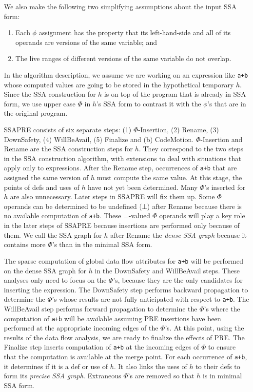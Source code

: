 We also make the following two simplifying assumptions about the input SSA
form:
\begin{enumerate}
\item Each $\phi$ assignment has the property that its left-hand-side and
all of its operands are versions of the same variable; and
\item The live ranges of different versions of the same variable do not
overlap.
\end{enumerate}

In the algorithm description, we assume we are working on an expression like
{\tt a+b} whose computed values are going to be stored in the hypothetical
temporary $h$.  Since the SSA construction for $h$ is on top of the program
that is already in SSA form, we use upper case $\Phi$ in $h$'s SSA form to 
contrast it with the $\phi$'s that are in the original program.

SSAPRE consists of six separate steps: (1) $\Phi$-Insertion, (2) Rename,
(3) DownSafety, (4) WillBeAvail, (5) Finalize and (b) CodeMotion.
$\Phi$-Insertion and Rename are the SSA construction steps for $h$.  They
correspond to the two steps in the SSA construction algorithm, with 
extensions to deal with situations that apply only to expressions.  After
the Rename step, occurrences of {\tt a+b} that are assigned the same version
of $h$ must compute the same value.  At this stage, the points of defs and
uses of $h$ have not yet been determined.  Many $\Phi$'s inserted for $h$
are also unnecessary.  Later steps in SSAPRE will fix them up.  Some $\Phi$
operands can be determined to be undefined ($\bot$) after Rename because 
there is no available computation of {\tt a+b}.  These $\bot$-valued
$\Phi$ operands will play a key role in the later steps of SSAPRE because
insertions are performed only because of them.  We call the SSA graph for
$h$ after Rename the \emph{dense SSA graph} because it contains more $\Phi$'s
than in the minimal SSA form.

The sparse computation of global data flow attributes for {\tt a+b} will be
performed on the dense SSA graph for $h$ in the DownSafety and WillBeAvail
steps.  These analyses only need to focus on the $\Phi$'s, because they
are the only candidates for inserting the expression.
The DownSafety step performs backward propagation to determine 
the $\Phi$'s whose results are not fully anticipated with respect to 
{\tt a+b}.  The WillBeAvail step performs forward propagation to determine
the $\Phi$'s where the computation of {\tt a+b} will be available assuming
PRE insertions have been performed at the appropriate incoming edges of the
$\Phi$'s.  At this point, using the results of the data flow analysis, we
are ready to finalize the effects of PRE.  The Finalize step inserts
computation of {\tt a+b} at the incoming edges of $\Phi$ to ensure that the
computation is available at the merge point.  For each occurrence of 
{\tt a+b}, it determines if it is a def or use of $h$.  It also links the
uses of $h$ to their defs to form its \emph{precise SSA graph}.
Extraneous $\Phi$'s are removed so that $h$ is in minimal SSA form.


